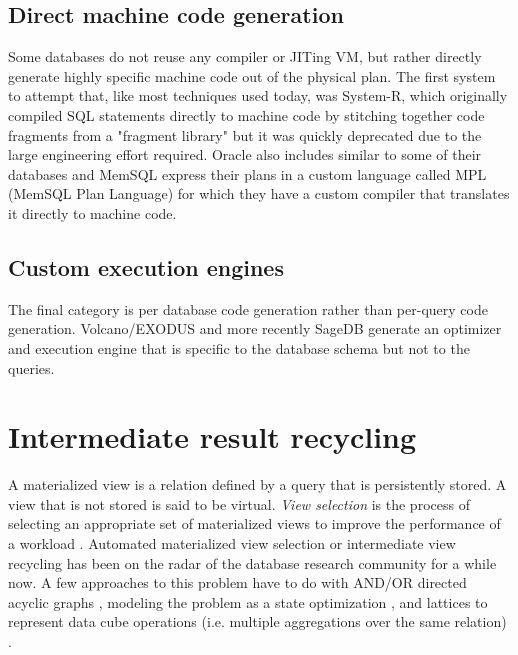 \subsection{Direct machine code generation}

Some databases do not reuse any compiler or JITing VM, but rather
directly generate highly specific machine code out of the physical
plan. The first system to attempt that, like most techniques used
today, was System-R, which originally compiled SQL statements directly
to machine code by stitching together code fragments from a "fragment
library" \cite{chamberlinHistoryEvaluationSystem1981} but it was
quickly deprecated due to the large engineering effort
required. Oracle also includes similar to some of their databases and
MemSQL express their plans in a custom language called MPL (MemSQL
Plan Language) for which they have a custom compiler that translates
it directly to machine code.

\subsection{Custom execution engines}

The final category is per database code generation rather than per-query
code generation. Volcano/EXODUS
\cite{graefeVolcanoOptimizerGenerator1993a} and more recently SageDB
\cite{kraskaSageDBLearnedDatabase} generate an optimizer and execution
engine that is specific to the database schema but not to the queries.

\section{Intermediate result recycling}

A materialized view is a relation defined by a query that is
persistently stored. A view that is not stored is said to be
virtual. \emph{View selection} is the process of selecting an
appropriate set of materialized views to improve the performance of a
workload \cite{mamiSurveyViewSelection2012}.  Automated materialized
view selection or intermediate view recycling has been on the radar of
the database research community for a while now. A few approaches to
this problem have to do with AND/OR directed acyclic graphs
\cite{guptaSelectionViewsMaterialize1997}, modeling the problem as a
state optimization \cite{theodoratosDataWarehouseConfiguration1997},
and lattices to represent data cube operations (i.e. multiple
aggregations over the same relation) \cite{ImplementingDataCubes}.

